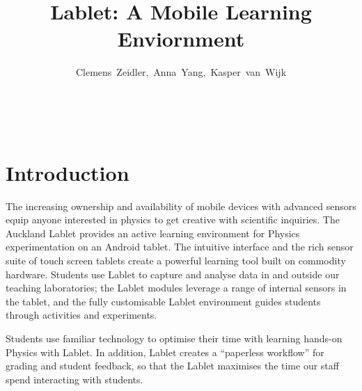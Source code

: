\documentclass{sigchi}
\begin{document}
\title{Lablet: A Mobile Learning Enviornment}


\author{
	\alignauthor \mbox{Clemens Zeidler, Anna Yang, Kasper van Wijk}\\
		\\
		\\
		\\
}

\maketitle


\begin{abstract}
\end{abstract}





\section{Introduction}
The increasing ownership and availability of mobile devices with advanced sensors equip anyone interested in physics to get creative with scientific inquiries.
The Auckland Lablet provides an active learning environment for Physics experimentation on an Android tablet.
The intuitive interface and the rich sensor suite of touch screen tablets create a powerful learning tool built on commodity hardware.
Students use Lablet to capture and analyse data in and outside our teaching laboratories; the Lablet modules leverage a range of internal sensors in the tablet, and the fully customisable Lablet environment guides students through activities and experiments.

Students use familiar technology to optimise their time with learning hands-on Physics with Lablet.
In addition, Lablet creates a “paperless workflow” for grading and student feedback, so that the Lablet maximises the time our staff spend interacting with students.
\end{document}
